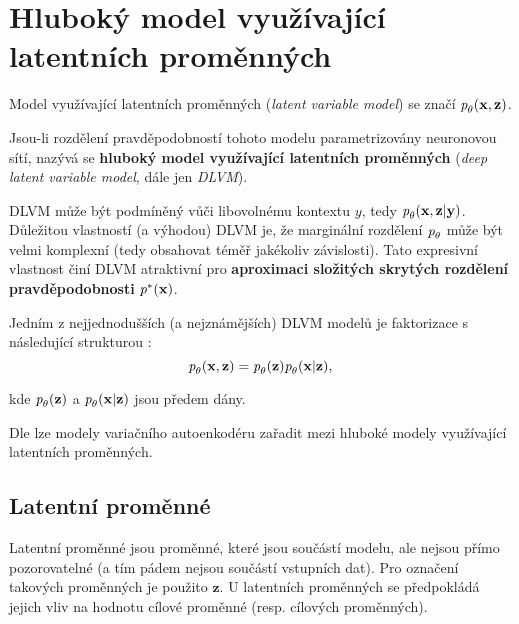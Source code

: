 \section{Hluboký model využívající latentních proměnných}
\label{sec:latent_variable_models}
Model využívající latentních proměnných (\emph{latent variable model}) se značí $\emph{p}_\theta(\mathbf{x}, \mathbf{z})$.

Jsou-li rozdělení pravděpodobností tohoto modelu parametrizovány neuronovou sítí,
nazývá se \textbf{hluboký model využívající latentních proměnných} (\emph{deep latent variable model}, dále jen \emph{DLVM}).

DLVM může být podmíněný vůči libovolnému kontextu $y$, tedy $\emph{p}_{\theta}(\mathbf{x}, \mathbf{z}|\mathbf{y})$.
Důležitou vlastností (a výhodou) DLVM je, že marginální rozdělení $\emph{p}_\theta$ může být velmi komplexní (tedy obsahovat téměř jakékoliv závislosti).
Tato expresivní vlastnost činí DLVM atraktivní pro \textbf{aproximaci složitých skrytých rozdělení pravděpodobnosti} $\emph{p}^*(\mathbf{x})$. \cite{Kingma2019}

Jedním z nejjednodušších (a nejznámějších) DLVM modelů je faktorizace s následující strukturou \cite{Kingma2019}:
\begin{equation}
    \emph{p}_\theta(\mathbf{x}, \mathbf{z}) = \emph{p}_\theta(\mathbf{z})\emph{p}_\theta(\mathbf{x}\mid\mathbf{z}),
\end{equation}

kde $\emph{p}_\theta(\mathbf{z})$ a $\emph{p}_\theta(\mathbf{x}\mid\mathbf{z})$ jsou předem dány.

Dle \textcite{Kingma2019} lze modely variačního autoenkodéru zařadit mezi hluboké modely využívající latentních proměnných.
\subsection{Latentní proměnné}
Latentní proměnné jsou proměnné, které jsou součástí modelu, ale nejsou přímo pozorovatelné (a tím pádem nejsou součástí vstupních dat).
Pro označení takových proměnných je použito $\mathbf{z}$. U latentních proměnných se předpokládá jejich vliv na hodnotu cílové proměnné (resp. cílových proměnných). \cite{Kingma2019}
